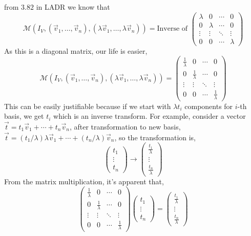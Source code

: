 \documentclass[letter]{article}
\begin{document}
from $3.82$ in LADR we know that 
\[
\mathcal M (I_V , \left(\vec{v}_1, \ldots, \vec{v}_n\right) , 
\left( \lambda \vec{v}_1, \ldots, \lambda \vec{v}_n\right)) = \text{Inverse of }
\begin{pmatrix} {\lambda} & 0 & \cdots & 0 \\ 
0 & {\lambda} & \cdots & 0 \\
\vdots & \vdots & \ddots & \vdots \\
0 & 0 & \cdots & {\lambda} \end{pmatrix}   
\]
As this is a diagonal matrix, our life is easier, 
\[
\mathcal M (I_V , \left(\vec{v}_1, \ldots, \vec{v}_n\right) , 
\left( \lambda \vec{v}_1, \ldots, \lambda \vec{v}_n\right)) = 
\begin{pmatrix} \frac{1}{\lambda} & 0 & \cdots & 0 \\ 
	0 & \frac{1}{\lambda} & \cdots & 0 \\
\vdots & \vdots & \ddots & \vdots \\
0 & 0 & \cdots & \frac{1}{\lambda} \end{pmatrix}   
\]
This can be easily justifiable because if we start with $\lambda t_i$ components for $i$-th basis, we get $t_i$ which is an inverse transform. For example, consider a vector $\vec{t} = t_1 \vec{v}_1 + \cdots + t_n \vec{v}_n$, after transformation to new basis, $\vec{t} = (t_1 / \lambda) \lambda \vec{v}_1 + \cdots + (t_n / \lambda) \vec{v}_n$, so the transformation is, 
\[
\begin{pmatrix} t_1 \\ \vdots \\ t_n \end{pmatrix}  \to  
\begin{pmatrix} \frac{t_1}{\lambda} \\ \vdots \\ \frac{t_n}{\lambda}  \end{pmatrix} 
\]
From the matrix multiplication, it's apparent that, 
\[
\begin{pmatrix} \frac{1}{\lambda} & 0 & \cdots & 0 \\ 
	0 & \frac{1}{\lambda} & \cdots & 0 \\
\vdots & \vdots & \ddots & \vdots \\
0 & 0 & \cdots & \frac{1}{\lambda} \end{pmatrix}   
\begin{pmatrix} t_1 \\ \vdots \\ t_n \end{pmatrix}  = 
\begin{pmatrix} \frac{t_1}{\lambda} \\ \vdots \\ \frac{t_n}{\lambda}  \end{pmatrix} 
\] 
\end{document}
